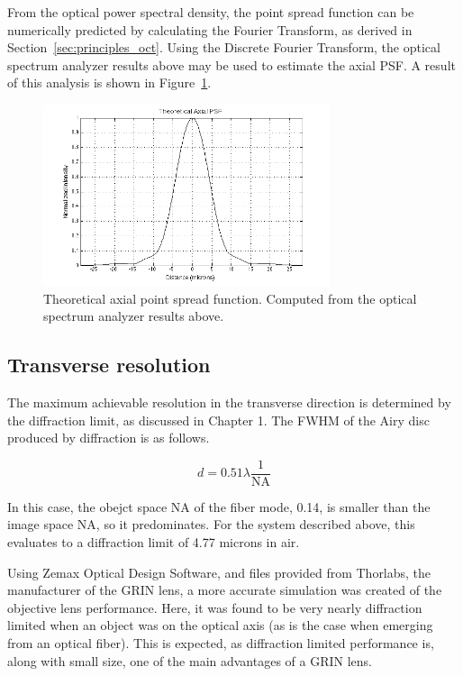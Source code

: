 From the optical power spectral density, the point spread function can be numerically predicted by calculating the Fourier Transform, as derived in Section~\ref{sec:principles_oct}. Using the Discrete Fourier Transform, the optical spectrum analyzer results above may be used to estimate the axial PSF. A result of this analysis is shown in Figure~\ref{fig:axial_psf_matlab}.

\begin{figure}[h!]
\centering
\includegraphics[width=0.75\textwidth]{Images/Background/theoretical_axial_psf.png}
\caption[Theoretical axial point spread function.]{Theoretical axial point spread function. Computed from the optical spectrum analyzer results above.\label{fig:axial_psf_matlab}}
\end{figure}

\subsection{Transverse resolution}
\label{sec:transverse_res}

The maximum achievable resolution in the transverse direction is determined by the diffraction limit, as discussed in Chapter 1. The FWHM of the Airy disc produced by diffraction is as follows. \cite{hecht}

\begin{equation} \label{eq:tres2}
d = 0.51 \lambda \frac{1}{\mathrm{NA}}
\end{equation}

In this case, the obejct space NA of the fiber mode, 0.14, is smaller than the image space NA, so it predominates. For the system described above, this evaluates to a diffraction limit of 4.77 microns in air.

Using Zemax Optical Design Software, and files provided from Thorlabs, the manufacturer of the GRIN lens, a more accurate simulation was created of the objective lens performance. Here, it was found to be very nearly diffraction limited when an object was on the optical axis (as is the case when emerging from an optical fiber). This is expected, as diffraction limited performance is, along with small size, one of the main advantages of a GRIN lens.

